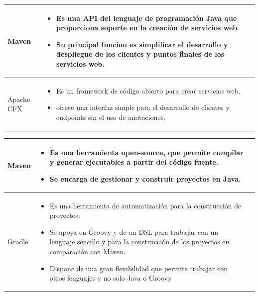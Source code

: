 \newpage
\begin{table}[b!]
	\centering
	\begin{tabular}{|p{2cm}|ll}
		\hline
		\multicolumn{1}{|p{5cm}|}{Maven}      &   
		\multicolumn{1}{p{10cm}|}{
		\begin{itemize}
		\vspace{5mm}
		\item Es una API del lenguaje de programación Java que proporciona soporte en la creación de servicios web 
		\item Su principal funcion es  simplificar el desarrollo y despliegue de los clientes y puntos finales de los servicios web.
		\end{itemize}} \\
		\hline
		\multicolumn{1}{|p{5cm}|}{Apache CFX} &   
		\multicolumn{1}{p{10cm}|}{
		\begin{itemize}
		\vspace{10mm}
		\item Es un framework de código abierto para crear servicios web.           
		\item ofrece una interfaz simple para el desarrollo de clientes y endpoints sin el uso de anotaciones.
		\end{itemize}} \\
		\hline
	\end{tabular}
\end{table}

   

\newpage
\begin{table}[b!]
	\centering
	\begin{tabular}{|p{2cm}|ll}
		\hline
		\multicolumn{1}{|p{5cm}|}{Maven}  &   
		\multicolumn{1}{p{10cm}|}{
		\begin{itemize}
		\vspace{5mm}
		\item Es una herramienta open-source, que permite compilar y generar ejecutables a partir del código fuente.
		\item Se encarga de gestionar y construir proyectos en Java.
		
		\end{itemize}} \\
		\hline
		\multicolumn{1}{|p{5cm}|}{Gradle} &   
		\multicolumn{1}{p{10cm}|}{
		\begin{itemize}
		\vspace{5mm}
		\item Es una herramienta de automatización para la construcción
		de proyectos.
		\item Se apoya en Groovy y de un DSL  para trabajar con un lenguaje sencillo y para la construcción de  los proyectos en comparación con Maven.
		\item Dispone de una gran flexibilidad que permite trabajar con otros
		lenguajes y no solo Java o Groovy
		\end{itemize}} \\
		\hline
	\end{tabular}
\end{table}

   
